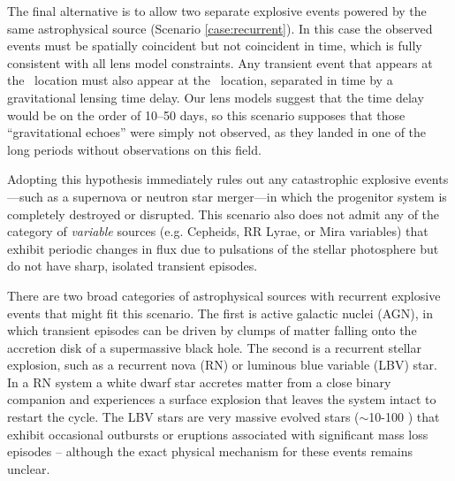 The final alternative is to allow two separate explosive events
powered by the same astrophysical source (Scenario
\ref{case:recurrent}).  In this case the observed events must be
spatially coincident but not coincident in time, which is fully
consistent with all lens model constraints.  Any transient event that
appears at the \spockone\ location must also appear at the
\spocktwo\ location, separated in time by a gravitational lensing time
delay.  Our lens models suggest that the time delay would be on the
order of 10--50 days, so this scenario supposes that those
``gravitational echoes'' were simply not observed, as they landed in
one of the long periods without \HST observations on this field.

Adopting this hypothesis immediately rules out any catastrophic
explosive events---such as a supernova or neutron star merger---in
which the progenitor system is completely destroyed or disrupted. This
scenario also does not admit any of the category of {\it variable}
sources (e.g. Cepheids, RR Lyrae, or Mira variables) that exhibit
periodic changes in flux due to pulsations of the stellar photosphere
but do not have sharp, isolated transient episodes.

There are two broad categories of astrophysical sources with
recurrent explosive events that might fit this scenario.  The first is
active galactic nuclei (AGN), in which transient episodes can be
driven by clumps of matter falling onto the accretion disk of a
supermassive black hole.  The second is a recurrent stellar explosion,
such as a recurrent nova (RN) or luminous blue variable (LBV) star.
In a RN system a white dwarf star accretes matter from a close binary
companion and experiences a surface explosion that leaves the system
intact to restart the cycle.  The LBV stars are very massive evolved
stars ($\sim$10-100 \Msun) that exhibit occasional outbursts or
eruptions associated with significant mass loss episodes -- although
the exact physical mechanism for these events remains unclear.

